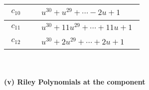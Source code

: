 \documentclass[1p]{elsarticle_modified}
\theoremstyle{definition}
\begin{document}
\begin{tabular}{m{50pt}|m{274pt}}
\hline $$\begin{aligned}c_{10}\end{aligned}$$&$\begin{aligned}
&u^{30}+u^{29}+\cdots-2 u+1
\end{aligned}$\\
\hline $$\begin{aligned}c_{11}\end{aligned}$$&$\begin{aligned}
&u^{30}+11 u^{29}+\cdots+11 u+1
\end{aligned}$\\
\hline $$\begin{aligned}c_{12}\end{aligned}$$&$\begin{aligned}
&u^{30}+2 u^{29}+\cdots+2 u+1
\end{aligned}$\\
\hline
\end{tabular}\\~\\
\newpage\renewcommand{\arraystretch}{1}
\flushleft \textbf{(v) Riley Polynomials at the component}\newline \\
\end{document}

